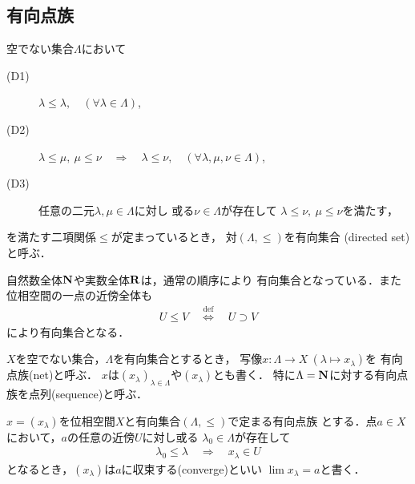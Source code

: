 \subsection{有向点族}
	\begin{screen}
		\begin{dfn}[有向集合]
			空でない集合$\Lambda$において
			\begin{description}
				\item[(D1)] $\lambda \leq \lambda,\quad (\forall \lambda \in \Lambda)$,
				\item[(D2)] $\lambda \leq \mu,\ \mu \leq \nu 
					\quad \Longrightarrow \quad \lambda \leq \nu,\quad 
					(\forall \lambda,\mu,\nu \in \Lambda)$,
				\item[(D3)] 任意の二元$\lambda,\mu \in \Lambda$に対し
					或る$\nu \in \Lambda$が存在して
					$\lambda \leq \nu,\ \mu \leq \nu$を満たす，
			\end{description}
			を満たす二項関係$\leq$が定まっているとき，
			対$(\Lambda,\leq)$を有向集合
			(directed set)と呼ぶ．
		\end{dfn}
	\end{screen}
	自然数全体$\mathbf{N}$や実数全体$\mathbf{R}$は，通常の順序により
	有向集合となっている．また位相空間の一点の近傍全体も
	\begin{align}
		U \leq V \quad \overset{\mathrm{def}}{\Longleftrightarrow} \quad
		U \supset V
	\end{align}
	により有向集合となる．
	
	\begin{screen}
		\begin{dfn}[有向点族]
			$X$を空でない集合，$\Lambda$を有向集合とするとき，
			写像$x:\Lambda \longrightarrow X\ (\lambda \longmapsto x_\lambda)$を
			有向点族(net)と呼ぶ．
			$x$は$(x_\lambda)_{\lambda \in \Lambda}$や$(x_\lambda)$とも書く．
			特に$\Lambda=\mathbf{N}$に対する有向点族を点列(sequence)と呼ぶ．
		\end{dfn}
	\end{screen}
	
	\begin{screen}
		\begin{dfn}[有向点族の収束]
			$x = (x_\lambda)$を位相空間$X$と有向集合$(\Lambda,\leq)$で定まる有向点族
			とする．点$a \in X$において，$a$の任意の近傍$U$に対し或る
			$\lambda_0 \in \Lambda$が存在して
			\begin{align}
				\lambda_0 \leq \lambda \quad \Longrightarrow \quad
				x_\lambda \in U
			\end{align}
			となるとき，$(x_\lambda)$は$a$に収束する(converge)といい
			$\lim x_\lambda = a$と書く．
		\end{dfn}
	\end{screen}
	
	\begin{screen}
		\begin{thm}
		\end{thm}
	\end{screen}
